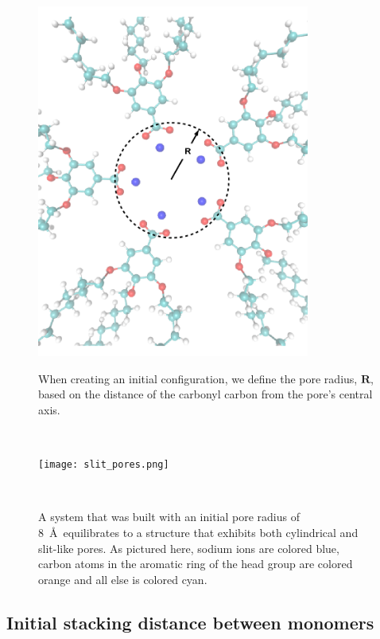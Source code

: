 \documentclass{article}
\begin{document}
  \begin{figure}[!htb]
  \centering
  \begin{minipage}{0.475\textwidth}
  \centering
  \includegraphics[width=0.8\textwidth]{pore_radius_illustration.png}
  \caption{When creating an initial configuration, we define the pore radius,
  $\mathbf{R}$, based on the distance of the carbonyl carbon from the pore's
  central axis.}~\label{fig:pore_radius_illustration}
  \end{minipage}\qquad
  \begin{minipage}{0.475\textwidth}
  \centering
  \vspace{4em}
  \texttt{[image: slit\_pores.png]}
  \vspace{1em}
  \caption{A system that was built with an initial pore radius of 8~\AA~equilibrates
  to a structure that exhibits both cylindrical and slit-like pores. As pictured 
  here, sodium ions are colored blue, carbon atoms in the aromatic ring of the head 
  group are colored orange and all else is colored cyan.}~\label{fig:slits}
  \end{minipage}
  \end{figure}

  \subsection{Initial stacking distance between monomers}\label{section:initial_dbwl}
\end{document}

